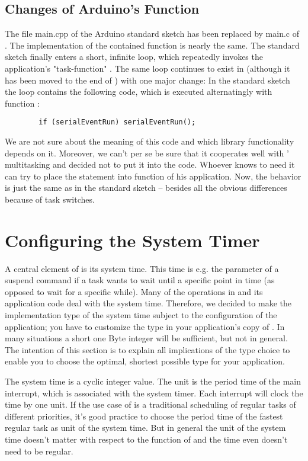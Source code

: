 \subsection{Changes of Arduino's  Function}

The file main.cpp of the Arduino standard sketch has been replaced by
main.c of \rtos. The implementation of the contained function 
is nearly the same. The standard sketch finally enters a short, infinite
loop, which repeatedly invokes the application's "task-function"
. The same loop continues to exist in \rtos{} (although it has
been moved to the end of ) with one major change: In
the standard sketch the loop contains the following code, which is
executed alternatingly with function :
\begin{verbatim}
		if (serialEventRun) serialEventRun();
\end{verbatim}
We are not sure about the meaning of this code and which library
functionality depends on it. Moreover, we can't per se be sure that it
cooperates well with \rtos{}' multitasking and decided not to put it into
the \rtos{} code. Whoever knows to need it can try to place the statement
into function  of his \rtos{} application. Now, the behavior
is just the same as in the standard sketch -- besides all the obvious
differences because of task switches.


\section{Configuring the System Timer}
\label{secSystemTimer}

A central element of \rtos{} is its system time. This time is e.g. the
parameter of a suspend command if a task wants to wait until a specific
point in time (as opposed to wait for a specific while). Many of the
operations in \rtos{} and its application code deal with the system time.
Therefore, we decided to make the implementation type of the system time
subject to the configuration of the application; you have to customize the
type in your application's copy of . In many
situations a short one Byte integer will be sufficient, but not in
general. The intention of this section is to explain all implications of
the type choice to enable you to choose the optimal, shortest possible
type for your application.

The system time is a cyclic integer value. The unit is the period time of
the main interrupt, which is associated with the system timer. Each
interrupt will clock the time by one unit. If the use case of \rtos{} is a
traditional scheduling of regular tasks of different priorities, it's good
practice to choose the period time of the fastest regular task as unit of
the system time. But in general the unit of the system time doesn't matter
with respect to the function of \rtos{} and the time even doesn't need to
be regular.

